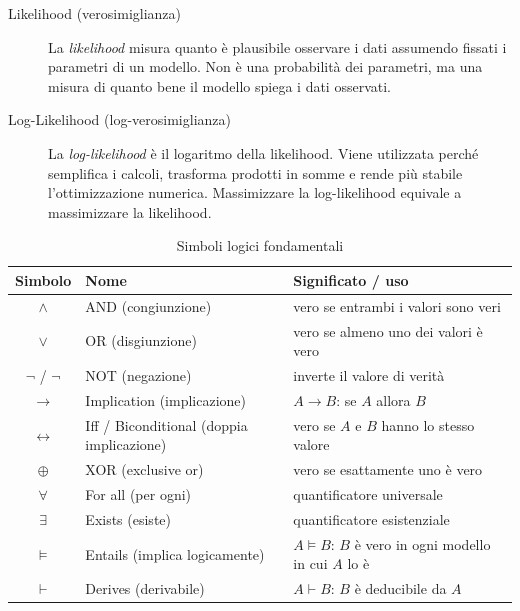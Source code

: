 \documentclass[a4paper,12pt]{report}
\begin{document}
\begin{description}
    \item[Likelihood (verosimiglianza)]
La \emph{likelihood} misura quanto è plausibile osservare i dati assumendo fissati
i parametri di un modello.
Non è una probabilità dei parametri, ma una misura di quanto bene il modello
spiega i dati osservati.

    \item[Log-Likelihood (log-verosimiglianza)]
La \emph{log-likelihood} è il logaritmo della likelihood.
Viene utilizzata perché semplifica i calcoli, trasforma prodotti in somme e rende
più stabile l’ottimizzazione numerica.
Massimizzare la log-likelihood equivale a massimizzare la likelihood.

\end{description}

\begin{table}[H]
\centering
\begin{tabular}{c l l}
\toprule
\textbf{Simbolo} & \textbf{Nome} & \textbf{Significato / uso} \\
\midrule
$\land$ & AND (congiunzione) & vero se entrambi i valori sono veri \\
$\lor$ & OR (disgiunzione) & vero se almeno uno dei valori è vero \\
$\lnot$ / $\neg$ & NOT (negazione) & inverte il valore di verità \\
$\to$ & Implication (implicazione) & $A \to B$: se $A$ allora $B$ \\
$\leftrightarrow$ & Iff / Biconditional (doppia implicazione) & vero se $A$ e $B$ hanno lo stesso valore \\
$\oplus$ & XOR (exclusive or) & vero se esattamente uno è vero \\
$\forall$ & For all (per ogni) & quantificatore universale \\
$\exists$ & Exists (esiste) & quantificatore esistenziale \\
$\models$ & Entails (implica logicamente) & $A \models B$: $B$ è vero in ogni modello in cui $A$ lo è \\
$\vdash$ & Derives (derivabile) & $A \vdash B$: $B$ è deducibile da $A$ \\
\bottomrule
\end{tabular}
\caption{Simboli logici fondamentali}
\end{table}
\end{document}
